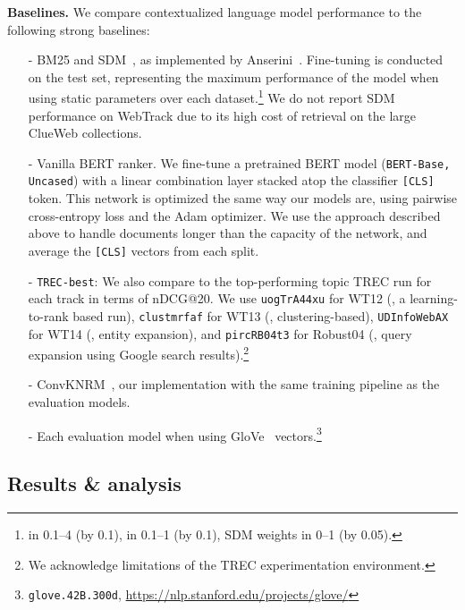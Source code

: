 \documentclass[sigconf]{acmart}
\begin{document}
\textbf{Baselines.}
We compare contextualized language model performance to the following strong baselines:
\begin{enumerate}[noitemsep,topsep=0pt,leftmargin=*]
\item[-] BM25 and SDM~\cite{Metzler2005AMR}, as implemented by Anserini~\cite{Yang2017AnseriniET}. Fine-tuning is conducted on the test set, representing the maximum performance of the model when using static parameters over each dataset.\footnote{ in 0.1--4 (by 0.1),  in 0.1--1 (by 0.1), SDM weights in 0--1 (by 0.05).} We do not report SDM performance on WebTrack due to its high cost of retrieval on the large ClueWeb collections.
\item[-] Vanilla BERT ranker. We fine-tune a pretrained BERT model (\texttt{BERT-Base, Uncased}) with a linear combination layer stacked atop the classifier \texttt{[CLS]} token. This network is optimized the same way our models are, using pairwise cross-entropy loss and the Adam optimizer. We use the approach described above to handle documents longer than the capacity of the network, and average the \texttt{[CLS]} vectors from each split.
\item[-] \texttt{TREC-best}: We also compare to the top-performing topic TREC run for each track in terms of nDCG@20. We use \texttt{uogTrA44xu} for WT12 (\cite{Limsopatham2012UniversityOG}, a learning-to-rank based run), \texttt{clustmrfaf} for WT13 (\cite{Raiber2013TheTA}, clustering-based), \texttt{UDInfoWebAX} for WT14 (\cite{Liu2014EntityCT}, entity expansion), and \texttt{pircRB04t3} for Robust04 (\cite{Kwok2004TREC2R}, query expansion using Google search results).\footnote{We acknowledge limitations of the TREC experimentation environment.}
\item[-] ConvKNRM~\cite{Dai2018ConvolutionalNN}, our implementation with the same training pipeline as the evaluation models.
\item[-] Each evaluation model when using GloVe~\cite{Pennington2014GloveGV} vectors.\footnote{\texttt{glove.42B.300d}, \url{https://nlp.stanford.edu/projects/glove/}}

\end{enumerate}


\subsection{Results \& analysis}
\end{document}
